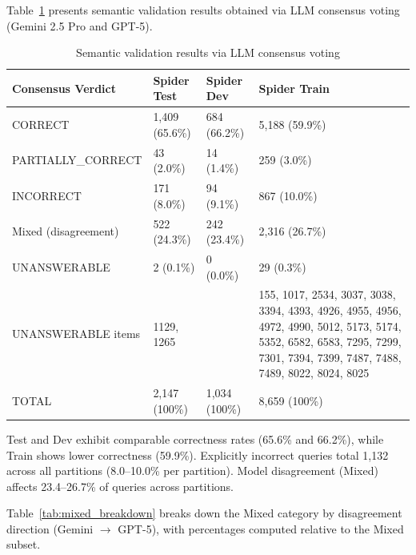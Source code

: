 \documentclass[]{einformatica}
\begin{document}
Table~\ref{tab:semantic} presents semantic validation results obtained via LLM consensus voting (Gemini 2.5 Pro and GPT-5).

\begin{table}[ht]
    \caption{Semantic validation results via LLM consensus voting}
    \label{tab:semantic}
    \centering
    \footnotesize
    \begin{tabular}{lp{}p{}p{}}
        \toprule
        \textbf{Consensus Verdict} & \textbf{Spider Test} & \textbf{Spider Dev} & \textbf{Spider Train} \\
        \midrule
        CORRECT & 1,409 (65.6\%) & 684 (66.2\%) & 5,188 (59.9\%) \\
        PARTIALLY\_CORRECT & 43 (2.0\%) & 14 (1.4\%) & 259 (3.0\%) \\
        INCORRECT & 171 (8.0\%) & 94 (9.1\%) & 867 (10.0\%) \\
        Mixed (disagreement) & 522 (24.3\%) & 242 (23.4\%) & 2,316 (26.7\%) \\
        UNANSWERABLE & 2 (0.1\%) & 0 (0.0\%) & 29 (0.3\%) \\
        UNANSWERABLE items & 1129, 1265 &  & 155, 1017, 2534, 3037, 3038, 3394, 4393, 4926, 4955, 4956, 4972, 4990, 5012, 5173, 5174, 5352, 6582, 6583, 7295, 7299, 7301, 7394, 7399, 7487, 7488, 7489, 8022, 8024, 8025 \\
        TOTAL & 2,147 (100\%) & 1,034 (100\%) & 8,659 (100\%) \\
        \bottomrule
    \end{tabular}
\end{table}

Test and Dev exhibit comparable correctness rates (65.6\% and 66.2\%), while Train shows lower correctness (59.9\%). Explicitly incorrect queries total 1,132 across all partitions (8.0--10.0\% per partition). Model disagreement (Mixed) affects 23.4--26.7\% of queries across partitions.

Table~\ref{tab:mixed_breakdown} breaks down the Mixed category by disagreement direction (Gemini $\rightarrow$ GPT-5), with percentages computed relative to the Mixed subset.
\end{document}
